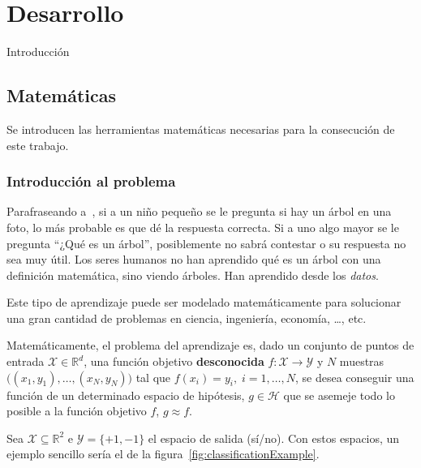 \documentclass[a4paper,11pt]{book}\usepackage[]{graphicx}\usepackage[]{color}
\begin{document}
\chapter{Desarrollo}


Introducción

\section{Matemáticas}

Se introducen las herramientas matemáticas necesarias para la consecución de este trabajo.



\subsection{Introducción al problema}

Parafraseando a~\cite{Abu-Mostafa:2012:LD:2207825}, si a un niño pequeño se le pregunta si hay un árbol
en una foto, lo más probable es que dé la respuesta correcta. Si a uno algo mayor
se le pregunta ``¿Qué es un árbol'', posiblemente no sabrá contestar o su respuesta
no sea muy útil. Los seres humanos no han aprendido qué es un árbol con una definición
matemática, sino viendo árboles. Han aprendido desde los \emph{datos}.

Este tipo de aprendizaje puede ser modelado matemáticamente para solucionar una gran
cantidad de problemas en ciencia, ingeniería, economía, \ldots, etc.

Matemáticamente, el problema del aprendizaje es, dado un conjunto de puntos de entrada
$\mathcal{X} \in \mathbb{R}^d$, una función objetivo \textbf{desconocida}
$f:\mathcal{X} \rightarrow \mathcal{Y}$ y $N$ muestras $\big((x_1,y_1),\ldots,(x_N,y_N) \big)$
tal que $f(x_i) = y_i, \; i = 1,\ldots,N$,
se desea conseguir una función de un determinado espacio de hipótesis, $g \in \mathcal{H}$ que se
asemeje todo lo posible a la función objetivo $f$, $g \approx f$.

Sea $\mathcal{X} \subseteq \mathbb{R}^2$ e $\mathcal{Y} = \{+1,-1\}$ el espacio de salida (sí/no).
Con estos espacios, un ejemplo sencillo sería el de la figura~\ref{fig:classificationExample}.
\end{document}
